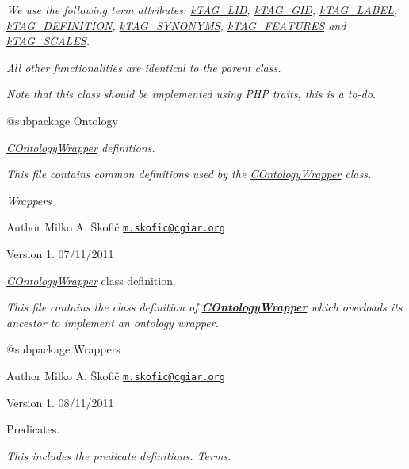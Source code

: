{\itshape We use the following term attributes\-: \hyperlink{}{k\-T\-A\-G\-\_\-\-L\-I\-D}, \hyperlink{}{k\-T\-A\-G\-\_\-\-G\-I\-D}, \hyperlink{}{k\-T\-A\-G\-\_\-\-L\-A\-B\-E\-L}, \hyperlink{}{k\-T\-A\-G\-\_\-\-D\-E\-F\-I\-N\-I\-T\-I\-O\-N}, \hyperlink{}{k\-T\-A\-G\-\_\-\-S\-Y\-N\-O\-N\-Y\-M\-S}, \hyperlink{}{k\-T\-A\-G\-\_\-\-F\-E\-A\-T\-U\-R\-E\-S} and \hyperlink{}{k\-T\-A\-G\-\_\-\-S\-C\-A\-L\-E\-S}.}

{\itshape All other functionalities are identical to the parent class.}

{\itshape Note that this class should be implemented using P\-H\-P traits, this is a to-\/do.}

{\itshape \begin{DoxyVerb} @subpackage        Ontology\end{DoxyVerb}
}

{\itshape \hyperlink{class_c_ontology_wrapper}{C\-Ontology\-Wrapper} definitions.}

{\itshape This file contains common definitions used by the \hyperlink{class_c_ontology_wrapper}{C\-Ontology\-Wrapper} class.}

{\itshape  Wrappers}

{\itshape \begin{DoxyAuthor}{Author}
Milko A. Škofič \href{mailto:m.skofic@cgiar.org}{\tt m.\-skofic@cgiar.\-org} 
\end{DoxyAuthor}
\begin{DoxyVersion}{Version}
1. 07/11/2011
\end{DoxyVersion}
{\itshape \hyperlink{class_c_ontology_wrapper}{C\-Ontology\-Wrapper}} class definition.}

{\itshape This file contains the class definition of {\bfseries \hyperlink{class_c_ontology_wrapper}{C\-Ontology\-Wrapper}} which overloads its ancestor to implement an ontology wrapper.}

{\itshape \begin{DoxyVerb} @subpackage        Wrappers
\end{DoxyVerb}
}

{\itshape \begin{DoxyAuthor}{Author}
Milko A. Škofič \href{mailto:m.skofic@cgiar.org}{\tt m.\-skofic@cgiar.\-org} 
\end{DoxyAuthor}
\begin{DoxyVersion}{Version}
1. 08/11/2011
\end{DoxyVersion}
Predicates.}

{\itshape This includes the predicate definitions. Terms.}

